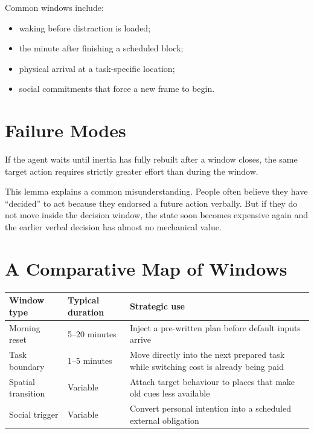 Common windows include:
\begin{itemize}[nosep]
  \item waking before distraction is loaded;
  \item the minute after finishing a scheduled block;
  \item physical arrival at a task-specific location;
  \item social commitments that force a new frame to begin.
\end{itemize}

\section{Failure Modes}

\begin{lemma}
If the agent waits until inertia has fully rebuilt after a window closes, the
same target action requires strictly greater effort than during the window.
\end{lemma}

\begin{discussion}
This lemma explains a common misunderstanding. People often believe they have
``decided'' to act because they endorsed a future action verbally. But if they
do not move inside the decision window, the state soon becomes expensive again
and the earlier verbal decision has almost no mechanical value.
\end{discussion}

\section{A Comparative Map of Windows}

\begin{center}
\begin{tabularx}{\textwidth}{@{}l l X@{}}
\toprule
Window type & Typical duration & Strategic use \\
\midrule
Morning reset & 5--20 minutes & Inject a pre-written plan before default inputs arrive \\
Task boundary & 1--5 minutes & Move directly into the next prepared task while switching cost is already being paid \\
Spatial transition & Variable & Attach target behaviour to places that make old cues less available \\
Social trigger & Variable & Convert personal intention into a scheduled external obligation \\
\bottomrule
\end{tabularx}
\end{center}

